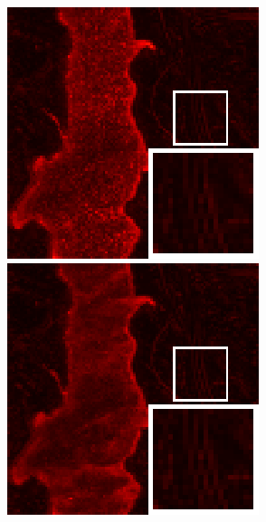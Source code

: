 \begin{figure}[t]
	\begin{center}
		\begin{minipage}{0.15\hsize}
			\centerline{\includegraphics[width=\hsize]{./fig_supplement/SAM_map_color_woboundary/JasperRidge/sam_map_SSTV.eps}} %
		\end{minipage}
		\begin{minipage}{0.15\hsize}
			\centerline{\includegraphics[width=\hsize]{./fig_supplement/SAM_map_color_woboundary/JasperRidge/sam_map_HSSTV_L1.eps}} %

\end{minipage}
\end{center}
\end{figure}
